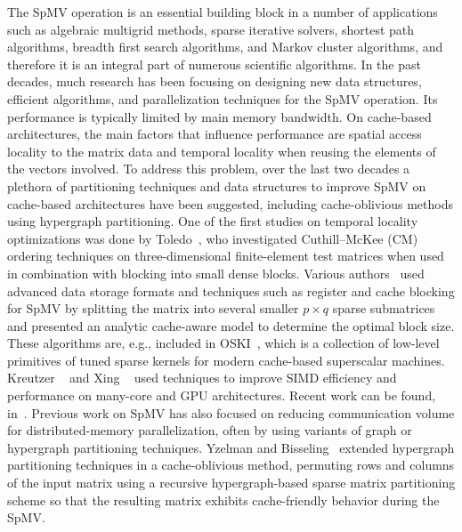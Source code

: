 The \Acrshort{SpMV} operation is an essential building block 
in a number of applications such as algebraic multigrid methods, 
sparse iterative solvers, shortest path algorithms, breadth first search algorithms, 
and Markov cluster algorithms, and therefore it is an integral part 
of numerous scientific algorithms.
In the past decades, much research has been
focusing on designing new data structures, efficient algorithms, and
parallelization  techniques for the \acrshort{SpMV} operation. Its performance is typically limited by main memory bandwidth. On
cache-based architectures, the main factors that influence performance
are spatial access locality to the matrix data and temporal locality when
reusing the elements of the vectors involved. To address this problem, over the
last two decades a plethora of  partitioning techniques
and data structures to improve \acrshort{SpMV} on cache-based
architectures have been suggested, including %
cache-oblivious methods using hypergraph partitioning. One
of the first studies on temporal locality optimizations was done
by Toledo~\cite{Toledo:1997:IMP:279511.279532}, who investigated
Cuthill--McKee (CM) ordering
techniques on three-dimensional finite-element test matrices when
used in combination with blocking into small dense blocks. Various
authors~\cite{Williams:2009:OSM:1513001.1513318,doi:10.1177/1094342004041296}
used advanced data storage formats and techniques such as register and cache blocking  for  
\acrshort{SpMV} by splitting the matrix into several smaller $p \times
q$ sparse submatrices and presented an analytic cache-aware model to
determine the optimal block size. These algorithms are, e.g.,
included in OSKI~\cite{1742-6596-16-1-071}, which is a collection of
low-level primitives of tuned sparse kernels for modern cache-based
superscalar machines. Kreutzer \etal~\cite{Moritz_sell}
 and Xing \etal~\cite{Liu:2013:ESM:2464996.2465013} used techniques to 
improve SIMD efficiency and performance on many-core and GPU architectures. 
Recent work can be found, \eg
in~\cite{li2017hbm,Liu:2015:CES:2751205.2751209,liu2015spmv}.
 Previous work on  \acrshort{SpMV}  has also focused on reducing
 communication volume for distributed-memory parallelization, often by using
 variants of graph or hypergraph partitioning
 techniques. Yzelman and
 Bisseling~\cite{doi:10.1137/080733243,Yzelman-thesis-2011} extended
 hypergraph partitioning techniques in a cache-oblivious method,
 permuting rows and columns of the input matrix using a recursive
 hypergraph-based sparse matrix partitioning scheme so that the
 resulting matrix exhibits cache-friendly behavior during the
 \acrshort{SpMV}.

